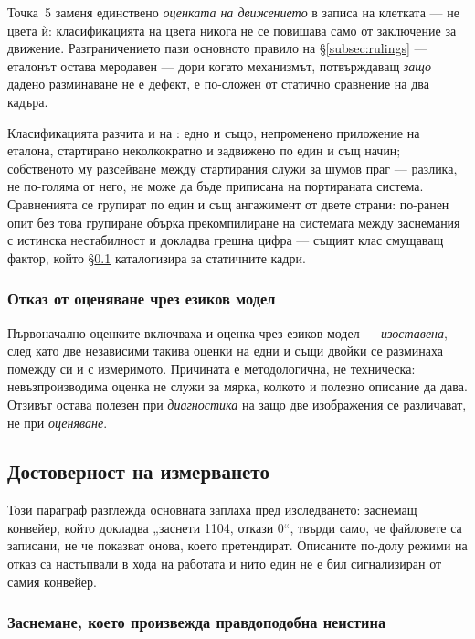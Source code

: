 Точка~5 заменя единствено \emph{оценката на движението} в записа на клетката --- не
цвета ѝ: класификацията на цвета никога не се повишава само от заключение за движение.
Разграничението пази основното правило на §\ref{subsec:rulings} --- еталонът остава
меродавен --- дори когато механизмът, потвърждаващ \emph{защо} дадено разминаване не е
дефект, е по-сложен от статично сравнение на два кадъра.

Класификацията разчита и на : едно и също, непроменено
приложение на еталона, стартирано неколкократно и задвижено по един и същ начин;
собственото му разсейване между стартирания служи за шумов праг --- разлика, не
по-голяма от него, не може да бъде приписана на портираната система. Сравненията се
групират по един и същ ангажимент от двете страни: по-ранен опит без това групиране
обърка прекомпилиране на системата между заснемания с истинска нестабилност и докладва
грешна цифра --- същият клас смущаващ фактор, който §\ref{subsec:integrity}
каталогизира за статичните кадри.

\subsubsection{Отказ от оценяване чрез езиков модел}

Първоначално оценките включваха и оценка чрез езиков модел --- \emph{изоставена}, след
като две независими такива оценки на едни и същи двойки се разминаха помежду си и с
измеримото. Причината е методологична, не техническа: невъзпроизводима оценка не служи
за мярка, колкото и полезно описание да дава. Отзивът остава полезен при
\emph{диагностика} на защо две изображения се различават, не при \emph{оценяване}.

\subsection{Достоверност на измерването}
\label{subsec:integrity}

Този параграф разглежда основната заплаха пред изследването: заснемащ конвейер, който
докладва „заснети 1104, откази 0“, твърди само, че файловете са записани, не че
показват онова, което претендират. Описаните по-долу режими на отказ са настъпвали в
хода на работата и нито един не е бил сигнализиран от самия конвейер.

\subsubsection{Заснемане, което произвежда правдоподобна неистина}

